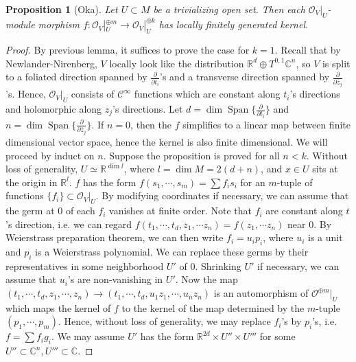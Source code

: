 \documentclass[12pt]{amsart}
\newtheorem{prop}[thm]{Proposition}
\theoremstyle{definition}
\theoremstyle{remark}
\numberwithin{equation}{section}
\newcommand{\del}{\partial}
\renewcommand{\del}{\partial}
\newcommand{\CO}{{\mathcal O}}
\newcommand{\cinf}{{\mathcal C}^{\infty}}
\newcommand{\R}{{\mathbb{R}}}
\newcommand{\C}{{\mathbb{C}}}
\newcommand{\1}{{\mathbb{1}}}
\newcommand{\Span}{\operatorname{Span}}
\begin{document}
\begin{prop}[Oka]
Let $U \subset M$ be a trivializing open set. Then each $\CO_V|_U$-module morphism $f: \CO_V|_U^{\oplus m} \to \CO_V|_U^{\oplus k}$ has locally finitely generated kernel.
\end{prop}
\begin{proof}
By previous lemma, it suffices to prove the case for $k = 1$. Recall that by Newlander-Nirenberg, $V$ locally look like the distribution $\R^d \oplus T^{0,1}\C^n$, so $V$ is split to a foliated direction spanned by $\frac{\del}{\del t_i}$'s and a transverse direction spanned by  $\frac{\del}{\del \overline{z}_j}$'s. Hence, $\CO_V|_U$ consists of $\cinf$ functions which are constant along $t_i$'s directions and holomorphic along $z_j$'s directions. Let $d= \dim \Span\{\frac{\del}{\del t_i} \}$  and $n = \dim \Span\{\frac{\del}{\del  \overline{z}_j} \}$. If $n = 0$, then the $f$ simplifies to a linear map between finite dimensional vector space, hence the kernel is also finite dimensional. We will proceed by induct on $n$. Suppose the proposition is proved for all $n < k$. Without loss of generality, $U\simeq \R^{\dim l}$, where $l = \dim M =2(d + n)$, and $x\in U$ sits at the origin in $\R^l$. $f$ has the form $f(s_1,\cdots, s_m) = \sum f_i s_i$ for an $m$-tuple of functions $\{f_i\} \subset \CO_V|_U$. By modifying coordinates if necessary, we can assume that the germ at $0$ of each $f_i$ vanishes at finite order. Note that $f_i$ are constant along $t$'s direction, i.e. we can regard $f(t_1,\cdots, t_d, z_1, \cdots z_n) = f(z_1, \cdots z_n)$ near 0. By Weierstrass preparation theorem, we can then write $f_i = u_i p_i$, where $u_i$ is a unit and $p_i$ is a Weierstrass polynomial. We can replace these germs by their representatives in some neighborhood $U'$ of $0$. Shrinking $U'$ if necessary, we can assume that $u_i$'s are non-vanishing in $U'$. Now the map $(t_1,\cdots, t_d,z_1,\cdots, z_n) \to (t_1,\cdots, t_d,u_1z_1,\cdots, u_nz_n)$ is an automorphism of $\CO^{\oplus m}|_U$ which maps the kernel of $f$ to the kernel of the map determined by the $m$-tuple $(p_1, \cdots, p_m)$. Hence, without loss of generality, we may replace $f_i$'s by $p_i$'s, i.e. $f = \sum f_i g_i$.
We may assume $U'$ has the form $\R^{2d}\times U'' \times U'''$ for some $U''\subset \C^n, U''' \subset \C$.

\end{proof}
\end{document}
